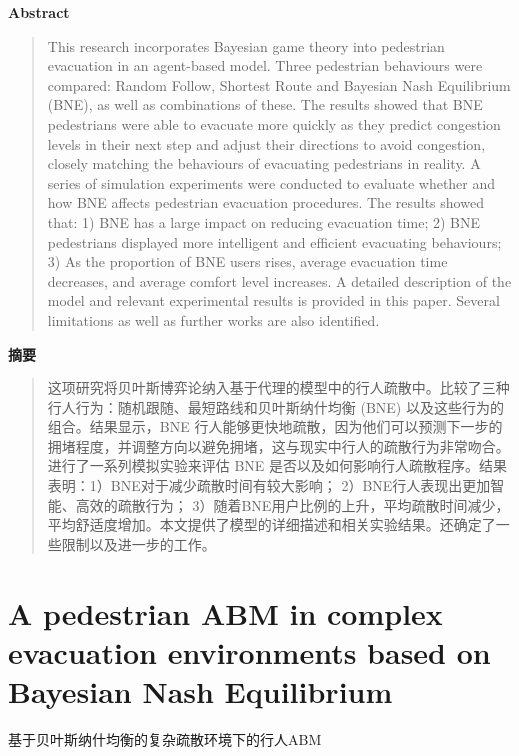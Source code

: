 \vspace{1.5em}
\noindent\textbf{Abstract}\par
\begin{quote}\small
This research incorporates Bayesian game theory into pedestrian evacuation in an agent-based model. Three pedestrian behaviours were compared: Random Follow, Shortest Route and Bayesian Nash Equilibrium (BNE), as well as combinations of these. The results showed that BNE pedestrians were able to evacuate more quickly as they predict congestion levels in their next step and adjust their directions to avoid congestion, closely matching the behaviours of evacuating pedestrians in reality. A series of simulation experiments were conducted to evaluate whether and how BNE affects pedestrian evacuation procedures. The results showed that: 1) BNE has a large impact on reducing evacuation time; 2) BNE pedestrians displayed more intelligent and efficient evacuating behaviours; 3) As the proportion of BNE users rises, average evacuation time decreases, and average comfort level increases. A detailed description of the model and relevant experimental results is provided in this paper. Several limitations as well as further works are also identified.
\end{quote}

\noindent\textbf{摘要}\par
\begin{quote}\small
这项研究将贝叶斯博弈论纳入基于代理的模型中的行人疏散中。比较了三种行人行为：随机跟随、最短路线和贝叶斯纳什均衡 (BNE) 以及这些行为的组合。结果显示，BNE 行人能够更快地疏散，因为他们可以预测下一步的拥堵程度，并调整方向以避免拥堵，这与现实中行人的疏散行为非常吻合。进行了一系列模拟实验来评估 BNE 是否以及如何影响行人疏散程序。结果表明：1）BNE对于减少疏散时间有较大影响； 2）BNE行人表现出更加智能、高效的疏散行为； 3）随着BNE用户比例的上升，平均疏散时间减少，平均舒适度增加。本文提供了模型的详细描述和相关实验结果。还确定了一些限制以及进一步的工作。
\end{quote}

\vspace{0.5em}


\chapter{A pedestrian ABM in complex evacuation environments based on Bayesian Nash Equilibrium}
\begin{center}\small 基于贝叶斯纳什均衡的复杂疏散环境下的行人ABM\end{center}

